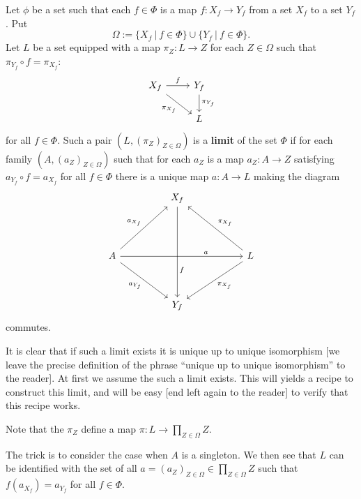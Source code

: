 \documentclass[12pt,letterpaper]{article}%
\begin{document}
Let $\phi$ be a set such that each $f\in\Phi$ is a map $f:X_f\to Y_f$ from a set $X_f$ to a set $Y_f$. Put 
$$
\Omega:=\{X_f\ |\ f\in\Phi\}\cup\{Y_f\ |\ f\in\Phi\}.
$$
Let $L$ be a set equipped with a map $\pi_Z:L\to Z$ for each $Z\in\Omega$ such that $\pi_{Y_f}\circ f=\pi_{X_f}$:
\[\begin{tikzcd}
	{X_f} & {Y_f} \\
	& L
	\arrow["f", from=1-1, to=1-2]
	\arrow["{\pi_{Y_f}}", from=1-2, to=2-2]
	\arrow["{\pi_{X_f}}"', from=1-1, to=2-2]
\end{tikzcd}\]
for all $f\in\Phi$. Such a pair $(L,(\pi_Z)_{Z\in\Omega})$ is a \textbf{limit} of the set $\Phi$ %
if for each family $(A,(a_Z)_{Z\in\Omega})$ such that for each $a_Z$ is a map $a_Z:A\to Z$ satisfying $a_{Y_f}\circ f=a_{X_f}$ for all $f\in\Phi$ there is a unique map $a:A\to L$ making the diagram 
\[\begin{tikzcd}
	&& {X_f} \\
	&&& {} \\
	A && {} && L \\
	\\
	&& {Y_f}
	\arrow["{a_{X_f}}", from=3-1, to=1-3]
	\arrow["{a_{Y_f}}"', from=3-1, to=5-3]
	\arrow["f"{pos=0.7}, from=1-3, to=5-3]
	\arrow["{\pi_{X_f}}"', from=3-5, to=1-3]
	\arrow["{\pi_{X_f}}", from=3-5, to=5-3]
	\arrow["a"{pos=0.7}, from=3-1, to=3-5]
\end{tikzcd}\]
commutes.

It is clear that if such a limit exists it is unique up to unique isomorphism [we leave the precise definition of the phrase ``unique up to unique isomorphism'' to the reader]. At first we assume the such a limit exists. This will yields a recipe to construct this limit, and will be easy [end left again to the reader] to verify that this recipe works.

Note that the $\pi_Z$ define a map $\pi:L\to\prod_{Z\in\Omega}Z$.

The trick is to consider the case when $A$ is a singleton. We then see that $L$ can be identified with the set of all $a=(a_Z)_{Z\in\Omega}\in\prod_{Z\in\Omega}Z$ such that $f(a_{X_f})=a_{Y_f}$ for all $f\in\Phi$.
\end{document}
